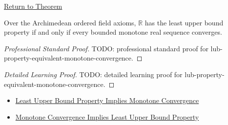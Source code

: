 \newpage
{}
\label{prf:lub-property-equivalent-monotone-convergence}

\begin{remark*}[Return]
\hyperref[thm:lub-property-equivalent-monotone-convergence]{Return to Theorem}
\end{remark*}

\begin{theorem*}
Over the Archimedean ordered field axioms, $\mathbb{R}$ has the least upper
bound property if and only if every bounded monotone real sequence converges.
\end{theorem*}

\begin{proof}[Professional Standard Proof]
\LRAProofBodyStart
TODO: professional standard proof for lub-property-equivalent-monotone-convergence.
\end{proof}

\begin{proof}[Detailed Learning Proof]
\LRAProofBodyStart
TODO: detailed learning proof for lub-property-equivalent-monotone-convergence.
\end{proof}

\begin{remark*}
\end{remark*}

\begin{dependencies}
\begin{itemize}
  \item \hyperref[thm:lub-property-implies-monotone-convergence]{Least Upper Bound Property Implies Monotone Convergence}
  \item \hyperref[thm:monotone-convergence-implies-lub-property]{Monotone Convergence Implies Least Upper Bound Property}
\end{itemize}
\end{dependencies}

\clearpage
